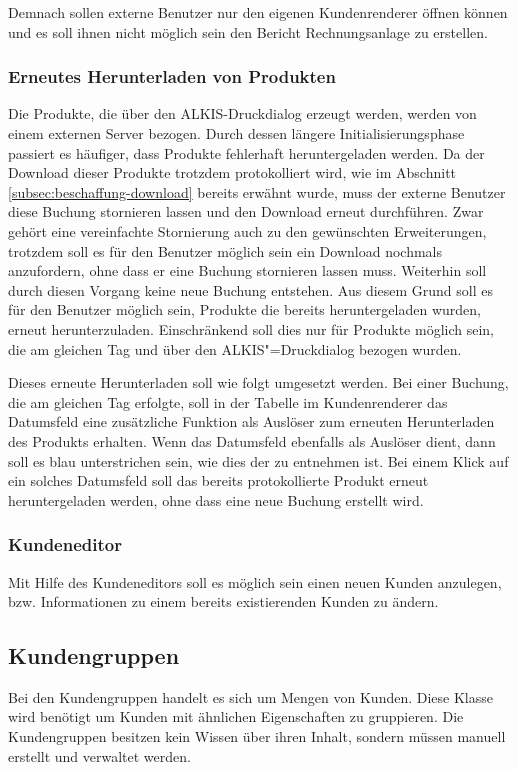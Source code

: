 Demnach sollen externe Benutzer nur den eigenen Kundenrenderer öffnen können und es soll ihnen nicht möglich sein den Bericht Rechnungsanlage zu erstellen.

\subsubsection{Erneutes Herunterladen von Produkten}
Die Produkte, die über den ALKIS-Druckdialog erzeugt werden, werden von einem externen Server bezogen.
Durch dessen längere Initialisierungsphase passiert es häufiger, dass Produkte fehlerhaft heruntergeladen werden.
Da der Download dieser Produkte trotzdem protokolliert wird, wie im Abschnitt \vref{subsec:beschaffung-download} bereits erwähnt wurde, muss der externe Benutzer diese Buchung stornieren lassen und den Download erneut durchführen.
Zwar gehört eine vereinfachte Stornierung auch zu den gewünschten Erweiterungen, trotzdem soll es für den Benutzer möglich sein ein Download nochmals anzufordern, ohne dass er eine Buchung stornieren lassen muss.
Weiterhin soll durch diesen Vorgang keine neue Buchung entstehen.
Aus diesem Grund soll es für den Benutzer möglich sein, Produkte die bereits heruntergeladen wurden, erneut herunterzuladen. Einschränkend soll dies nur für Produkte möglich sein, die am gleichen Tag und über den ALKIS"=Druckdialog bezogen wurden. 

Dieses erneute Herunterladen soll wie folgt umgesetzt werden. Bei einer Buchung, die am gleichen Tag erfolgte, soll in der Tabelle im Kundenrenderer das Datumsfeld eine zusätzliche Funktion als Auslöser zum erneuten Herunterladen des Produkts erhalten.
Wenn das Datumsfeld ebenfalls als Auslöser dient, dann soll es blau unterstrichen sein, wie dies der  zu entnehmen ist.
Bei einem Klick auf ein solches Datumsfeld soll das bereits protokollierte Produkt erneut heruntergeladen werden, ohne dass eine neue Buchung erstellt wird.

\subsubsection{Kundeneditor}
Mit Hilfe des Kundeneditors soll es möglich sein einen neuen Kunden anzulegen, bzw. Informationen zu einem bereits existierenden Kunden zu ändern.

\subsection{Kundengruppen}
Bei den Kundengruppen handelt es sich um Mengen von Kunden. Diese Klasse wird benötigt um Kunden mit ähnlichen Eigenschaften zu gruppieren.
Die Kundengruppen besitzen kein Wissen über ihren Inhalt, sondern müssen manuell erstellt und verwaltet werden.

